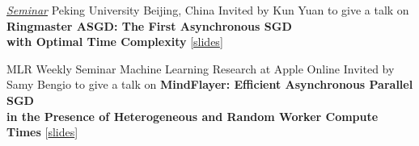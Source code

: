 \documentclass[10pt,a4paper,sans]{moderncv}        %
\newcommand{\red}{\color{cherry}}
\newcommand{\kaust}{KAUST}
\newcommand{\thuwal}{Thuwal, Saudi Arabia}
\newcommand{\highlight}[1]{{\red #1}}
\begin{document}
    {\textcolor{accent}{\href{https://artomaranjyan.github.io/assets/pdf/Peking_talk_announcment.jpg}{\textit{Seminar}}}}
    {Peking University}
    {Beijing, China}
    {}
    {
      Invited by \highlight{Kun Yuan} to give a talk on \textbf{Ringmaster ASGD: The First Asynchronous SGD\\
      with Optimal Time Complexity} [{\href{https://artomaranjyan.github.io/assets/pdf/Ringmaster_Peking_Uni.pdf}{slides}}]
    }





    {MLR Weekly Seminar}
    {Machine Learning Research at Apple}
    {Online}
    {}
    {
      Invited by \highlight{Samy Bengio} to give a talk on \textbf{MindFlayer: Efficient Asynchronous Parallel SGD \\ in the Presence of Heterogeneous and Random Worker Compute Times} [{\href{https://artomaranjyan.github.io/assets/pdf/MindFlayer_AppleMLR.pdf}{slides}}]
    }
\end{document}
